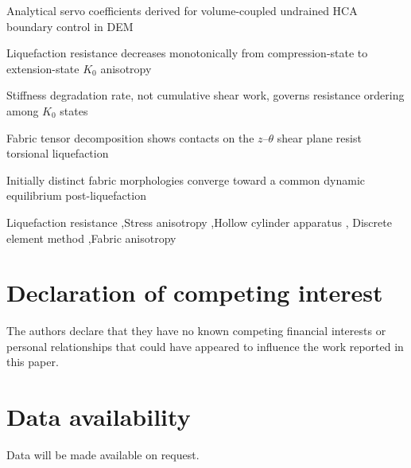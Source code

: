 \documentclass[a4paper,fleqn]{cas-sc}
\newcommand{\Kzero}{\ensuremath{K_0}}
\begin{document}
\begin{highlights}
\item Analytical servo coefficients derived for volume-coupled undrained HCA boundary control in DEM
\item Liquefaction resistance decreases monotonically from compression-state to extension-state \Kzero{} anisotropy
\item Stiffness degradation rate, not cumulative shear work, governs resistance ordering among \Kzero{} states
\item Fabric tensor decomposition shows contacts on the $z$--$\theta$ shear plane resist torsional liquefaction
\item Initially distinct fabric morphologies converge toward a common dynamic equilibrium post-liquefaction
\end{highlights}

\begin{keywords}
Liquefaction resistance \sep Stress anisotropy \sep Hollow cylinder apparatus \sep
Discrete element method \sep Fabric anisotropy
\end{keywords}

\maketitle






\section*{Declaration of competing interest}
The authors declare that they have no known competing financial interests or
personal relationships that could have appeared to influence the work reported
in this paper.

\section*{Data availability}
Data will be made available on request.


\printcredits

\appendix






\end{document}
